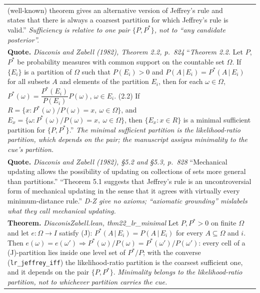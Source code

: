 \documentclass[10pt]{article}
\theoremstyle{definition}
\newlength{\fullw}\setlength{\fullw}{25.9cm}
\begin{document}
{\begin{longtable}{|p{0.9cm}|p{12.2cm}|p{12.2cm}|}
{(well-known) theorem gives an alternative version of Jeffrey's rule and states that there
is always a coarsest partition for which Jeffrey's rule is valid.'' \newline \textit{Sufficiency is relative to one pair $\{P,P^*\}$, not to ``any candidate posterior''.}} \\
\multicolumn{3}{|p{\fullw}|}{\textbf{Quote.} \textit{Diaconis and Zabell (1982), Theorem 2.2, p.~824} \newline ``\textit{Theorem 2.2.} Let $P$, $P^*$ be probability measures with common support on
the countable set $\Omega$. If $\{E_i\}$ is a partition of $\Omega$ such that $P(E_i)>0$ and
$P(A\,|\,E_i)=P^*(A\,|\,E_i)$ for all subsets $A$ and elements of the partition $E_i$, then
for each $\omega\in\Omega$, $P^*(\omega)=\dfrac{P^*(E_i)}{P(E_i)}P(\omega)$, $\omega\in E_i$.
(2.2) If $R=\{x:P^*(\omega)/P(\omega)=x,\ \omega\in\Omega\}$, and
$E_x=\{\omega:P^*(\omega)/P(\omega)=x,\ \omega\in\Omega\}$, then $\{E_x:x\in R\}$ is a
minimal sufficient partition for $\{P,P^*\}$.'' \newline \textit{The minimal sufficient partition is the likelihood-ratio partition, which depends on the pair; the manuscript assigns minimality to the cue's partition.}} \\
\multicolumn{3}{|p{\fullw}|}{\textbf{Quote.} \textit{Diaconis and Zabell (1982), \S5.2 and \S5.3, p.~828} \newline ``Mechanical updating allows the possibility of updating on collections of sets more
general than partitions.'' ``Theorem 5.1 suggests that Jeffrey's rule is an uncontroversial
form of mechanical updating in the sense that it agrees with virtually every
minimum-distance rule.'' \newline \textit{D-Z give no axioms; ``axiomatic grounding'' mislabels what they call mechanical updating.}} \\
\multicolumn{3}{|p{\fullw}|}{\textbf{Theorem.} \textit{DiaconisZabell.lean, thm22\_lr\_minimal} \newline Let $P,P^*>0$ on finite $\Omega$ and let $e:\Omega\to I$ satisfy (J):
$P^*(A\,|\,E_i)=P(A\,|\,E_i)$ for every $A\subseteq\Omega$ and $i$. Then
$e(\omega)=e(\omega')\Rightarrow P^*(\omega)/P(\omega)=P^*(\omega')/P(\omega')$: every cell
of a (J)-partition lies inside one level set of $P^*/P$; with the converse
(\texttt{lr\_jeffrey\_iff}) the likelihood-ratio partition is the coarsest sufficient one, and it
depends on the pair $\{P,P^*\}$. \newline \textit{Minimality belongs to the likelihood-ratio partition, not to whichever partition carries the cue.}} \\

\end{longtable}}
\end{document}
